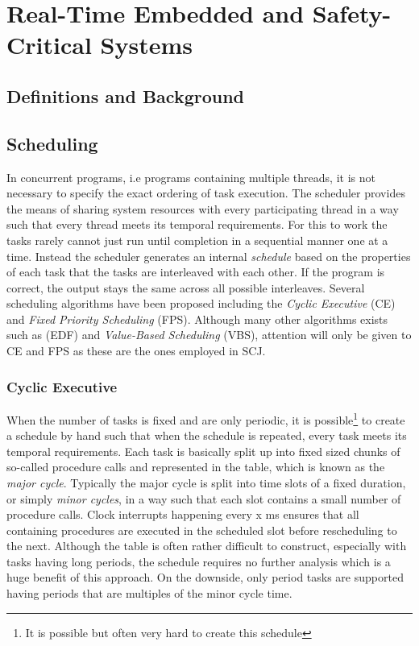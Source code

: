 \chapter{Real-Time Embedded and Safety-Critical Systems}
\label{chapter:rts}

\section{Definitions and Background} %
\label{sec:definitions_and_background}


\section{Scheduling} %
\label{sec:scheduling}
In concurrent programs, i.e programs containing multiple threads, it is not necessary to specify the exact ordering of task execution. The scheduler provides the means of sharing system resources with every participating thread in a way such that every thread meets its temporal requirements. For this to work the tasks rarely cannot just run until completion in a sequential manner one at a time. Instead the scheduler generates an internal \textit{schedule} based on the properties of each task that the tasks are interleaved with each other. If the program is correct, the output stays the same across all possible interleaves. Several scheduling algorithms have been proposed including the \textit{Cyclic Executive} (CE) and \textit{Fixed Priority Scheduling} (FPS). Although many other algorithms exists such as  (EDF) and \textit{Value-Based Scheduling} (VBS), attention will only be given to CE and FPS as these are the ones employed in SCJ.

\subsection{Cyclic Executive}
When the number of tasks is fixed and are only periodic, it is possible\footnote{It is possible but often very hard to create this schedule} to create a schedule by hand such that when the schedule is repeated, every task meets its temporal requirements. Each task is basically split up into fixed sized chunks of so-called procedure calls and represented in the table, which is known as the \textit{major cycle}. Typically the major cycle is split into time slots of a fixed duration, or simply \textit{minor cycles}, in a way such that each slot contains a small number of procedure calls. Clock interrupts happening every x ms ensures that all containing procedures are executed in the scheduled slot before rescheduling to the next. Although the table is often rather difficult to construct, especially with tasks having long periods, the schedule requires no further analysis which is a huge benefit of this approach. On the downside, only period tasks are supported having periods that are multiples of the minor cycle time.

